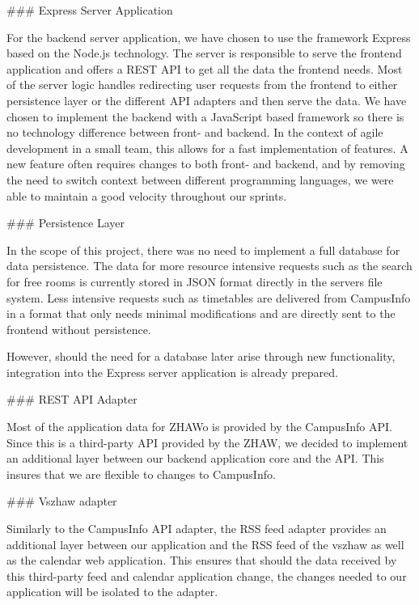 \begin{markdown}
### Express Server Application

For the backend server application, we have chosen to use the framework Express \cite{Express} based on the Node.js \cite{Node} technology. The server is responsible to serve the frontend application and offers a REST API to get all the data the frontend needs. Most of the server logic handles redirecting user requests from the frontend to either persistence layer or the different API adapters and then serve the data. We have chosen to implement the backend with a JavaScript based framework so there is no technology difference between front- and backend. In the context of agile development in a small team, this allows for a fast implementation of features. A new feature often requires changes to both front- and backend, and by removing the need to switch context between different programming languages, we were able to maintain a good velocity throughout our sprints.

### Persistence Layer

In the scope of this project, there was no need to implement a full database for data persistence. The data for more resource intensive requests such as the search for free rooms is currently stored in JSON format directly in the servers file system. Less intensive requests such as timetables are delivered from CampusInfo in a format that only needs minimal modifications and are directly sent to the frontend without persistence.

However, should the need for a database later arise through new functionality, integration into the Express server application is already prepared.

### REST API Adapter

Most of the application data for ZHAWo is provided by the CampusInfo API. Since this is a third-party API provided by the ZHAW, we decided to implement an additional layer between our backend application core and the API. This insures that we are flexible to changes to CampusInfo.

### Vszhaw adapter

Similarly to the CampusInfo API adapter, the RSS feed adapter provides an additional layer between our application and the RSS feed of the vszhaw as well as the calendar web application\cite{vszhawCalendar}. This ensures that should the data received by this third-party feed and calendar application change, the changes needed to our application will be isolated to the adapter.

\newpage


\end{markdown}
